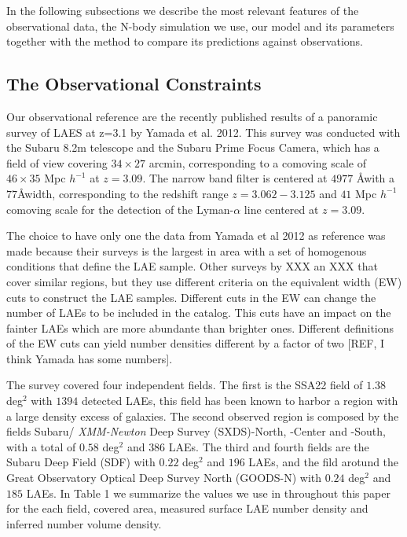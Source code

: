 \documentclass{emulateapj}
\begin{document}
In the following subsections we describe the most relevant features of
the observational data, the N-body simulation we use, our model and
its parameters together with the method to compare its predictions
against observations. 

\subsection{The Observational Constraints}

Our observational reference are the recently published results of a
panoramic survey of LAES at z=3.1 by Yamada et al. 2012. This survey
was conducted with the Subaru 8.2m telescope and the Subaru Prime
Focus Camera, which has a field of view covering $34\times 27$ arcmin,
corresponding to a comoving scale of $46\times35$ Mpc $h^{-1}$ at
$z=3.09$. The narrow band filter is centered at $4977$ \AA with a
$77$\AA width, corresponding to the redshift range $z=3.062-3.125$ and
$41$ Mpc $h^{-1}$ comoving scale for the detection of the
Lyman-$\alpha$ line centered at $z=3.09$. 

The choice to have only one the data from Yamada et al 2012 as
reference was  made because their surveys is the largest in area with
a set of homogenous conditions that define the LAE sample. Other
surveys by XXX an XXX that cover similar regions, but they use
different criteria on the equivalent width (EW) cuts to construct the
LAE samples. Different cuts in the EW can change the number of LAEs to
be included in the catalog. This cuts have an impact on the fainter
LAEs which are more abundante than brighter ones. Different
definitions of the EW cuts can yield number densities different by a
factor of two [REF, I think Yamada has some numbers]. 
 

The survey covered four independent fields. The first is the SSA22
field of $1.38$ deg$^2$ with $1394$ detected LAEs, this field has been
known to harbor a region with a large density excess of galaxies. The
second observed region is composed by the fields Subaru/{\it
  XMM-Newton} Deep Survey (SXDS)-North, -Center and -South, with a 
total of $0.58$ deg$^2$ and $386$ LAEs. The third and fourth fields
are the Subaru Deep Field (SDF) with $0.22$ deg$^2$ and $196$ LAEs,
and the fild arotund the Great Observatory Optical Deep Survey North
(GOODS-N) with $0.24$ deg$^2$ and $185$ LAEs. In Table 1 we summarize
the values we use in throughout this paper for the each field, covered
area, measured surface LAE number density and inferred number volume
density. 
\end{document}

